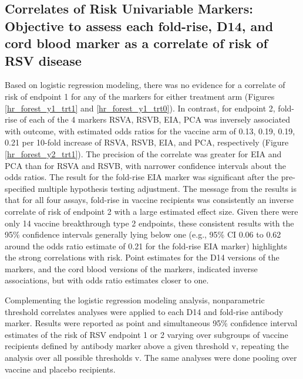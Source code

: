 \documentclass[11pt]{article}
\begin{document}
\hypertarget{correlates-of-risk-univariable-markers-objective-to-assess-each-fold-rise-d14-and-cord-blood-marker-as-a-correlate-of-risk-of-rsv-disease}{%
\subsection{Correlates of Risk Univariable Markers: Objective to assess each fold-rise, D14, and cord blood marker as a correlate of risk of RSV disease}\label{correlates-of-risk-univariable-markers-objective-to-assess-each-fold-rise-d14-and-cord-blood-marker-as-a-correlate-of-risk-of-rsv-disease}}

Based on logistic regression modeling, there was no evidence for a correlate of risk of endpoint 1 for any of the markers for either treatment arm
(Figures \ref{hr_forest_y1_trt1} and \ref{hr_forest_y1_trt0}).
In contrast, for endpoint 2, fold-rise of each of the 4 markers RSVA, RSVB, EIA, PCA was inversely associated with outcome,
with estimated odds ratios for the vaccine arm of 0.13, 0.19, 0.19, 0.21 per 10-fold increase of RSVA, RSVB, EIA, and PCA, respectively
(Figure \ref{hr_forest_y2_trt1}). The precision of the correlate was greater for EIA and PCA than for RSVA and RSVB, with narrower confidence intervals about the odds ratios. The result for the fold-rise EIA marker was significant after the pre-specified multiple hypothesis testing adjustment. The message from the results is that for all four assays, fold-rise in vaccine recipients was consistently an inverse correlate of risk of endpoint 2 with a large estimated effect size. Given there were only 14 vaccine breakthrough type 2 endpoints, these consistent results with the 95\% confidence intervals generally lying below one (e.g., 95\% CI 0.06 to 0.62 around the odds ratio estimate of 0.21 for the fold-rise EIA marker) highlights the strong correlations with risk. Point estimates for the D14 versions of the markers, and the cord blood versions of the markers, indicated inverse associations, but with odds ratio estimates closer to one.

Complementing the logistic regression modeling analysis, nonparametric threshold correlates analyses were applied to each D14 and fold-rise antibody marker. Results were reported
as point and simultaneous 95\% confidence interval estimates of the risk of RSV endpoint 1 or 2
varying over subgroups of vaccine recipients defined by antibody marker above a given threshold v, repeating the analysis over all possible thresholds v. The same analyses were done pooling over vaccine and placebo recipients.
\end{document}
